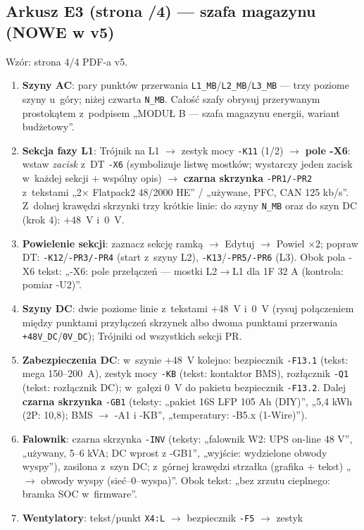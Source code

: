 \documentclass[11pt,a4paper]{article}
\begin{document}
\subsection{Arkusz E3 (strona /4) --- szafa magazynu (NOWE w v5)}
Wzór: strona 4/4 PDF-a v5.
\begin{enumerate}
\item \textbf{Szyny AC}: pary punktów przerwania \texttt{L1\_MB}/\texttt{L2\_MB}/\texttt{L3\_MB} ---
trzy poziome szyny u~góry; niżej czwarta \texttt{N\_MB}. Całość szafy obrysuj przerywanym prostokątem
z~podpisem „MODUŁ B --- szafa magazynu energii, wariant budżetowy''.
\item \textbf{Sekcja fazy L1}: Trójnik na L1 $\to$ zestyk mocy \texttt{-K11} (1/2) $\to$ \textbf{pole
-X6}: wstaw \emph{zacisk} z~DT \texttt{-X6} (symbolizuje listwę mostków; wystarczy jeden zacisk
w~każdej sekcji $+$ wspólny opis) $\to$ \textbf{czarna skrzynka} \texttt{-PR1/-PR2} z~tekstami
„2$\times$ Flatpack2 48/2000 HE'' / „używane, PFC, CAN 125 kb/s''. Z~dolnej krawędzi skrzynki trzy
krótkie linie: do szyny \texttt{N\_MB} oraz do szyn DC (krok 4): $+$48~V i~0~V.
\item \textbf{Powielenie sekcji}: zaznacz sekcję ramką $\to$ Edytuj $\to$ Powiel $\times$2; popraw DT:
\texttt{-K12}/\texttt{-PR3/-PR4} (start z~szyny L2), \texttt{-K13}/\texttt{-PR5/-PR6} (L3). Obok pola
-X6 tekst: „-X6: pole przełączeń --- mostki L2$\to$L1 dla 1F 32 A (kontrola: pomiar -U2)''.
\item \textbf{Szyny DC}: dwie poziome linie z~tekstami $+$48~V i~0~V (rysuj połączeniem między punktami
przyłączeń skrzynek albo dwoma punktami przerwania \texttt{+48V\_DC}/\texttt{0V\_DC}); Trójniki od
wszystkich sekcji PR.
\item \textbf{Zabezpieczenia DC}: w~szynie $+$48~V kolejno: bezpiecznik \texttt{-F13.1} (tekst: mega
150--200~A), zestyk mocy \texttt{-KB} (tekst: kontaktor BMS), rozłącznik \texttt{-Q1} (tekst: rozłącznik
DC); w~gałęzi 0~V do pakietu bezpiecznik \texttt{-F13.2}. Dalej \textbf{czarna skrzynka} \texttt{-GB1}
(teksty: „pakiet 16S LFP 105 Ah (DIY)'', „5,4 kWh (2P: 10,8); BMS $\to$ -A1 i -KB'', „temperatury:
-B5.x (1-Wire)'').
\item \textbf{Falownik}: czarna skrzynka \texttt{-INV} (teksty: „falownik W2: UPS on-line 48 V'',
„używany, 5--6 kVA; DC wprost z -GB1'', „wyjście: wydzielone obwody wyspy''), zasilona z~szyn DC;
z~górnej krawędzi strzałka (grafika $+$ tekst) „$\to$ obwody wyspy (sieć--0--wyspa)''. Obok tekst:
„bez zrzutu cieplnego: bramka SOC w~firmware''.
\item \textbf{Wentylatory}: tekst/punkt \texttt{X4:L} $\to$ bezpiecznik \texttt{-F5} $\to$ zestyk

\end{enumerate}
\end{document}
